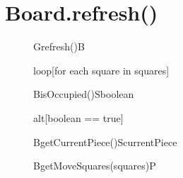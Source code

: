 \documentclass[8pt]{article}
\begin{document}
\section{Board.refresh()}
\begin{figure}[H]
	\centering
  	\begin{adjustbox}{width=\textwidth}
		\begin{sequencediagram}
			      
			\begin{call}{G}{refresh()}{B}{}	
				\begin{sdblock}{loop}{[for each square in squares]}
					\begin{call}{B}{isOccupied()}{S}{boolean}
					\end{call}
					\begin{sdblock}{alt}{[boolean == true]}
						\begin{call}{B}{getCurrentPiece()}{S}{currentPiece}
						\end{call}
						
				  		\begin{call}{B}{getMoveSquares(squares)}{P}{}
						\end{call}
				  		
				  		
				  	\end{sdblock}
	    
	    
				\end{sdblock}	
			\end{call}
		
		\end{sequencediagram}
	\end{adjustbox}
\end{figure}
\end{document}
